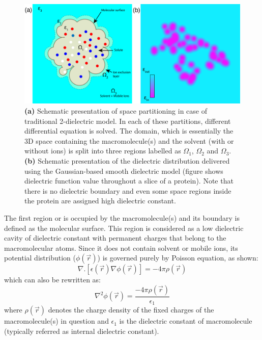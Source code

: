 \documentclass[9pt,tutorial]{livecoms}
\begin{document}
\begin{figure}[hbt!]
\includegraphics[width=0.95\linewidth]{Figure_1.png}
\caption{\textbf{(a)} Schematic presentation of space partitioning in case of traditional 2-dielectric model. In each of these partitions, different differential equation is solved. The domain, which is essentially the 3D space containing the macromolecule(s) and the solvent (with or without ions) is split into three regions labelled as $ \Omega_1$, $ \Omega_2 $ and $ \Omega_3 $. \textbf{(b)} Schematic presentation of the dielectric distribution delivered using the Gaussian-based smooth dielectric model (figure shows dielectric function value throughout a slice of a protein). Note that there is no dielectric boundary and even some space regions inside the protein are assigned high dielectric constant.}
\label{fig:Figure_1}
\end{figure}

The first region or  is occupied by the macromolecule(s) and its boundary is defined as the molecular surface. This region is considered as a low dielectric cavity of dielectric constant with permanent charges that belong to the macromolecular atoms. Since it does not contain solvent or mobile ions, its potential distribution ($\phi(\Vec{r})$) is governed purely by Poisson equation, as shown:
$$ 
\nabla . \left[ \epsilon(\Vec{r})\nabla\phi(\Vec{r}) \right] = -4\pi\rho(\Vec{r}) 
$$
which can also be rewritten as:
$$ 
\nabla^2\phi(\Vec{r}) = \frac{-4\pi\rho(\Vec{r})}{\epsilon_1} 
$$
where $ \rho(\Vec{r}) $ denotes the charge density of the fixed charges of the macromolecule(s) in question and $ \epsilon_1 $ is the dielectric constant of macromolecule (typically referred as internal dielectric constant). 
\end{document}

